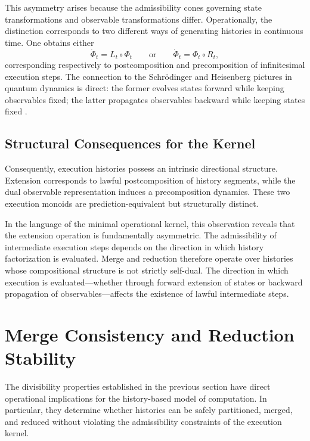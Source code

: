 \documentclass[12pt]{article}
\begin{document}
This asymmetry arises because the admissibility cones governing state transformations and
observable transformations differ. Operationally, the distinction corresponds to two different
ways of generating histories in continuous time. One obtains either
\[
\dot{\Phi}_t = L_t \circ \Phi_t
\qquad \text{or} \qquad
\dot{\Phi}_t = \Phi_t \circ R_t,
\]
corresponding respectively to postcomposition and precomposition of infinitesimal execution
steps. The connection to the Schr\"odinger and Heisenberg pictures in quantum dynamics is
direct: the former evolves states forward while keeping observables fixed; the latter propagates
observables backward while keeping states fixed \cite{settimo2026, breuer2009, rivas2010}.

\subsection{Structural Consequences for the Kernel}

Consequently, execution histories possess an intrinsic directional structure. Extension
corresponds to lawful postcomposition of history segments, while the dual observable
representation induces a precomposition dynamics. These two execution monoids are
prediction-equivalent but structurally distinct.

In the language of the minimal operational kernel, this observation reveals that the extension
operation is fundamentally asymmetric. The admissibility of intermediate execution steps
depends on the direction in which history factorization is evaluated. Merge and reduction
therefore operate over histories whose compositional structure is not strictly self-dual. The
direction in which execution is evaluated---whether through forward extension of states or
backward propagation of observables---affects the existence of lawful intermediate steps.

\section{Merge Consistency and Reduction Stability}
\label{sec:merge_reduction}

The divisibility properties established in the previous section have direct operational
implications for the history-based model of computation. In particular, they determine whether
histories can be safely partitioned, merged, and reduced without violating the admissibility
constraints of the execution kernel.
\end{document}
